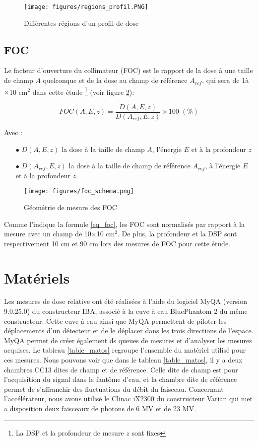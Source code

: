 \documentclass{book}
\begin{document}
\begin{figure}[h]
  \centering
  \texttt{[image: figures/regions\_profil.PNG]}
  \caption{Différentes régions d'un profil de dose}
  \label{fig_regions_profil}
\end{figure}

\subsection{FOC}

Le facteur d'ouverture du collimateur (FOC) est le rapport de la dose à une taille de champ $A$ quelconque et de la dose au champ de référence $A_{ref}$, qui sera de 1à$\times$10 cm$^2$ dans cette étude \footnote{La DSP et la profondeur de mesure $z$ sont fixes} (voir figure \ref*{fig_foc}):

\begin{equation}
    FOC(A, E, z) = \dfrac{D(A, E, z)}{D(A_{ref}, E, z)} \times 100 \; (\%)
    \label{eq_foc}
\end{equation}

Avec :

\begin{itemize}
    \item[$\bullet$] $D(A, E, z)$ la dose à la taille de champ $A$, l'énergie $E$ et à la profondeur $z$
    \item[$\bullet$] $D(A_{ref}, E, z)$ la dose à la taille de champ de référence $A_{ref}$, à l'énergie $E$ et à la profondeur $z$
\end{itemize}

\begin{figure}[h]
  \centering
  \texttt{[image: figures/foc\_schema.png]}
  \caption{Géométrie de mesure des FOC \cite{mayles2007handbook}}
  \label{fig_foc}
\end{figure}

Comme l'indique la formule \ref*{eq_foc}, les FOC sont normalisés par rapport à la mesure avec un champ de 10$\times$10 cm$^2$. De plus, la profondeur et la DSP sont respectivement 10 cm et 90 cm lors des mesures de FOC pour cette étude.

\section{Matériels}

Les mesures de dose relative ont été réalisées à l'aide du logiciel MyQA (version 9.0.25.0) du constructeur IBA, associé à la cuve à eau BluePhantom 2 du même constructeur. Cette cuve à eau ainsi que MyQA permettent de piloter les déplacements d'un détecteur et de le déplacer dans les trois directions de l'espace. MyQA permet de créer également ds queues de mesures et d'analyser les mesures acquises. Le tableau \ref*{table_matos} regroupe l'ensemble du matériel utilisé pour ces mesures. Nous pouvons voir que dans le tableau \ref*{table_matos}, il y a deux chambres CC13 dites de champ et de référence. Celle dite de champ est pour l'acquisition du signal dans le fantôme d'eau, et la chambre dite de référence permet de s'affranchir des fluctuations du débit du faisceau. Concernant l'accélérateur, nous avons utilisé le Clinac iX2300 du constructeur Varian qui met a disposition deux faisceaux de photons de 6 MV et de 23 MV.
\end{document}
